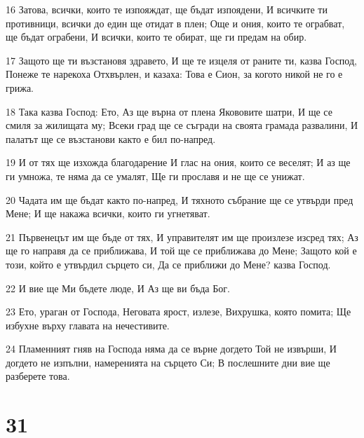 \par 16 Затова, всички, които те изпояждат, ще бъдат изпоядени, И всичките ти противници, всички до един ще отидат в плен; Още и ония, които те ограбват, ще бъдат ограбени, И всички, които те обират, ще ги предам на обир.
\par 17 Защото ще ти възстановя здравето, И ще те изцеля от раните ти, казва Господ, Понеже те нарекоха Отхвърлен, и казаха: Това е Сион, за когото никой не го е грижа.
\par 18 Така казва Господ: Ето, Аз ще върна от плена Якововите шатри, И ще се смиля за жилищата му; Всеки град ще се съгради на своята грамада развалини, И палатът ще се възстанови както е бил по-напред.
\par 19 И от тях ще изхожда благодарение И глас на ония, които се веселят; И аз ще ги умножа, те няма да се умалят, Ще ги прославя и не ще се унижат.
\par 20 Чадата им ще бъдат както по-напред, И тяхното събрание ще се утвърди пред Мене; И ще накажа всички, които ги угнетяват.
\par 21 Първенецът им ще бъде от тях, И управителят им ще произлезе изсред тях; Аз ще го направя да се приближава, И той ще се приближава до Мене; Защото кой е този, който е утвърдил сърцето си, Да се приближи до Мене? казва Господ.
\par 22 И вие ще Ми бъдете люде, И Аз ще ви бъда Бог.
\par 23 Ето, ураган от Господа, Неговата ярост, излезе, Вихрушка, която помита; Ще избухне върху главата на нечестивите.
\par 24 Пламенният гняв на Господа няма да се върне догдето Той не извърши, И догдето не изпълни, намеренията на сърцето Си; В послешните дни вие ще разберете това.

\chapter{31}

